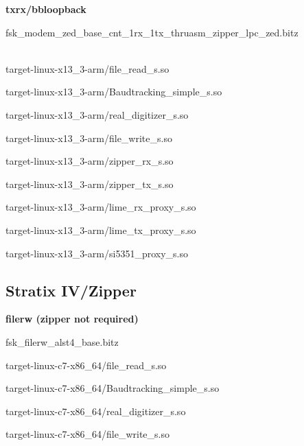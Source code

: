 	\noindent\textbf{txrx/bbloopback}
	\begin{itemize}
	\item fsk\_modem\_zed\_base\_cnt\_1rx\_1tx\_thruasm\_zipper\_lpc\_zed.bitz \\ \\
	\begin{minipage}[t]{.5\textwidth}
	\item target-linux-x13\_3-arm/file\_read\_s.so
	\item target-linux-x13\_3-arm/Baudtracking\_simple\_s.so
	\item target-linux-x13\_3-arm/real\_digitizer\_s.so
	\item target-linux-x13\_3-arm/file\_write\_s.so
	\end{minipage}
	\begin{minipage}[t]{.5\textwidth}
	\item target-linux-x13\_3-arm/zipper\_rx\_s.so
	\item target-linux-x13\_3-arm/zipper\_tx\_s.so
	\item target-linux-x13\_3-arm/lime\_rx\_proxy\_s.so
	\item target-linux-x13\_3-arm/lime\_tx\_proxy\_s.so
	\item target-linux-x13\_3-arm/si5351\_proxy\_s.so
	\end{minipage}
	\end{itemize}

\pagebreak
\subsection{Stratix IV/Zipper}
	\noindent\textbf{filerw (zipper not required)}
	\begin{itemize}
	\begin{minipage}[t]{.5\textwidth}
	\item fsk\_filerw\_alst4\_base.bitz
	\item target-linux-c7-x86\_64/file\_read\_s.so
	\item target-linux-c7-x86\_64/Baudtracking\_simple\_s.so
	\end{minipage}
	\begin{minipage}[t]{.5\textwidth}
	\item target-linux-c7-x86\_64/real\_digitizer\_s.so
	\item target-linux-c7-x86\_64/file\_write\_s.so
	\end{minipage}
	\end{itemize}

